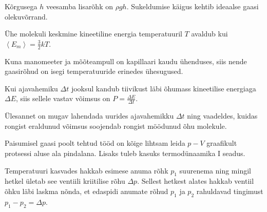 \documentclass[10pt]{article}
\begin{document}
{
\hint
Kõrgusega $h$ veesamba lisarõhk on $\rho gh$. Sukeldumise käigus kehtib ideaalse gaasi olekuvõrrand.
\probend
\bigskip


\hint
Ühe molekuli keskmine kineetiline energia temperatuuril $T$ avaldub kui $\left\langle E_{m}\right\rangle=\frac{3}{2} k T$.
\probend
\bigskip


\hint
Kuna manomeeter ja mõõteampull on kapillaari kaudu ühenduses, siis nende gaasirõhud on isegi temperatuuride erinedes ühesugused.
\probend
\bigskip


\hint
Kui ajavahemiku $\Delta t$ jooksul kandub tiivikust läbi õhumass kineetilise energiaga $\Delta E$, siis sellele vastav võimsus on $P = \frac{\Delta E}{\Delta t}$.
\probend
\bigskip


\hint
Ülesannet on mugav lahendada uurides ajavahemikku $\Delta t$ ning vaadeldes, kuidas rongist eraldunud võimsus soojendab rongist möödunud õhu molekule.
\probend
\bigskip


\hint
Paisumisel gaasi poolt tehtud tööd on kõige lihtsam leida $p-V$ graafikult protsessi aluse ala pindalana. Lisaks tuleb kasuks termodünaamika I seadus.
\probend
\bigskip


\hint
Temperatuuri kasvades hakkab esimese anuma rõhk $p_1$ suurenema ning mingil hetkel ületab see ventiili kriitilise rõhu $\Delta p$. Sellest hetkest alates hakkab ventiil õhku läbi laskma nõnda, et edaspidi anumate rõhud $p_1$ ja $p_2$ rahuldavad tingimust $p_1 - p_2 = \Delta p$.
\probend
\bigskip

}
\end{document}
